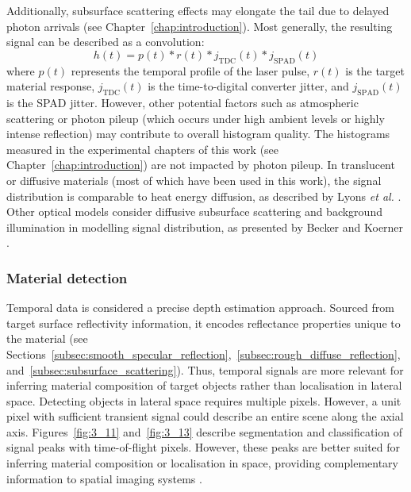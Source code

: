 \documentclass[12pt,a4paper,oneside]{report}
\begin{document}
Additionally, subsurface scattering effects may elongate the tail due to delayed photon arrivals (see Chapter~\ref{chap:introduction}). Most generally, the resulting signal can be described as a convolution:
\begin{equation}
h(t) = p(t) * r(t) * j_{\text{TDC}}(t) * j_{\text{SPAD}}(t)
\label{eq:temporal_convolution}
\end{equation}
where $p(t)$ represents the temporal profile of the laser pulse, $r(t)$ is the target material response, $j_{\text{TDC}}(t)$ is the time-to-digital converter jitter, and $j_{\text{SPAD}}(t)$ is the SPAD jitter. However, other potential factors such as atmospheric scattering or photon pileup (which occurs under high ambient levels or highly intense reflection) may contribute to overall histogram quality. The histograms measured in the experimental chapters of this work (see Chapter~\ref{chap:introduction}) are not impacted by photon pileup. In translucent or diffusive materials (most of which have been used in this work), the signal distribution is comparable to heat energy diffusion, as described by Lyons \textit{et al.} \cite{lyons2019}. Other optical models consider diffusive subsurface scattering and background illumination in modelling signal distribution, as presented by Becker and Koerner \cite{becker2023}.

\subsubsection{Material detection}
\label{subsubsec:temporal_material_detection}

Temporal data is considered a precise depth estimation approach. Sourced from target surface reflectivity information, it encodes reflectance properties unique to the material (see Sections~\ref{subsec:smooth_specular_reflection},~\ref{subsec:rough_diffuse_reflection}, and~\ref{subsec:subsurface_scattering}). Thus, temporal signals are more relevant for inferring material composition of target objects rather than localisation in lateral space. Detecting objects in lateral space requires multiple pixels. However, a unit pixel with sufficient transient signal could describe an entire scene along the axial axis. Figures~\ref{fig:3_11} and~\ref{fig:3_13} describe segmentation and classification of signal peaks with time-of-flight pixels. However, these peaks are better suited for inferring material composition or localisation in space, providing complementary information to spatial imaging systems \cite{su2016,becker2023,yang2024}.
\end{document}
